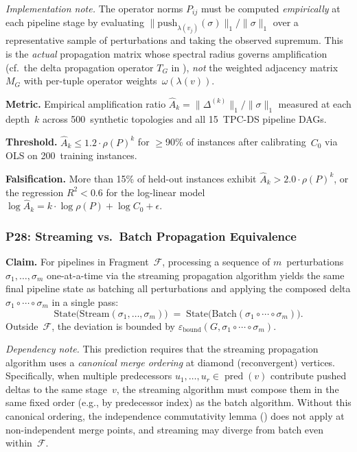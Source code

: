 \documentclass[11pt,a4paper]{article}
\theoremstyle{definition}
\newcommand{\push}{\mathrm{push}}
\newcommand{\FragF}{\mathcal{F}}
\newcommand{\ebound}{\varepsilon_{\mathrm{bound}}}
\DeclareMathOperator{\pred}{pred}
\begin{document}
\emph{Implementation note.}  The operator norms $P_{ij}$ must be computed
\emph{empirically} at each pipeline stage by evaluating
$\|\push_{\lambda(v_j)}(\sigma)\|_1 / \|\sigma\|_1$ over a representative
sample of perturbations and taking the observed supremum.  This is the
\emph{actual} propagation matrix whose spectral radius governs amplification
(cf.\ the delta propagation operator $T_G$ in ),
\emph{not} the weighted adjacency matrix $M_G$ with per-tuple operator
weights~$\omega(\lambda(v))$.

\textbf{Metric.}  Empirical amplification ratio
$\hat{A}_k = \|\Delta^{(k)}\|_1 / \|\sigma\|_1$ measured at each depth~$k$
across 500~synthetic topologies and all 15~TPC-DS pipeline DAGs.

\textbf{Threshold.}  $\hat{A}_k \leq 1.2 \cdot \rho(P)^k$ for
$\geq$90\% of instances after calibrating~$C_0$ via OLS on
200~training instances.

\textbf{Falsification.}  More than 15\% of held-out instances exhibit
$\hat{A}_k > 2.0 \cdot \rho(P)^k$, or the regression $R^2 < 0.6$ for the
log-linear model $\log \hat{A}_k = k \cdot \log \rho(P) + \log C_0 +
\epsilon$.

\subsubsection{P28: Streaming vs.\ Batch Propagation Equivalence}
\label{sec:p28}

\textbf{Claim.}
For pipelines in Fragment~$\FragF$, processing a sequence of $m$~perturbations
$\sigma_1, \ldots, \sigma_m$ one-at-a-time via the streaming propagation
algorithm yields the same final pipeline state as batching all perturbations
and applying the composed delta $\sigma_1 \circ \cdots \circ \sigma_m$ in a
single pass:
\[
  \mathrm{State}\bigl(\mathrm{Stream}(\sigma_1, \ldots, \sigma_m)\bigr)
  \;=\;
  \mathrm{State}\bigl(\mathrm{Batch}(\sigma_1 \circ \cdots \circ \sigma_m)\bigr).
\]
Outside~$\FragF$, the deviation is bounded by
$\ebound(G, \sigma_1 \circ \cdots \circ \sigma_m)$.

\emph{Dependency note.}  This prediction requires that the streaming
propagation algorithm uses a \emph{canonical merge ordering} at diamond
(reconvergent) vertices.  Specifically, when multiple predecessors
$u_1, \ldots, u_r \in \pred(v)$ contribute pushed deltas to the same
stage~$v$, the streaming algorithm must compose them in the same fixed order
(e.g., by predecessor index) as the batch algorithm.  Without this canonical
ordering, the independence commutativity lemma
()
does not apply at non-independent merge points, and streaming may diverge
from batch even within~$\FragF$.
\end{document}
